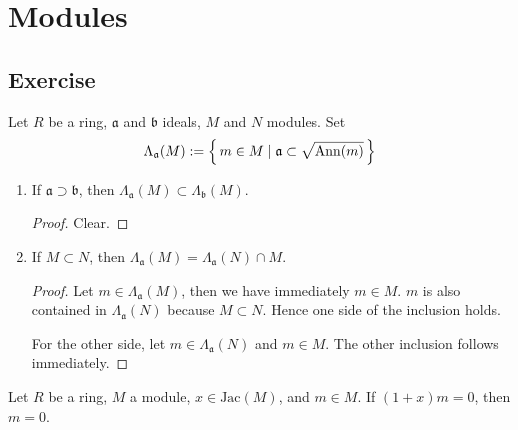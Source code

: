 \chapter{Modules}

\section{Exercise}

\begin{exr}
    Let \(R\) be a ring, \(\mathfrak{a}\) and \(\mathfrak{b}\) ideals, \(M\) and \(N\) modules. Set
    \begin{equation}
        \Lambda_{\mathfrak{a}}(M) := \left\{\, m \in M \mathrel{\mid} \mathfrak{a} \subset \sqrt{\mathrm{Ann}(m)} \,\right\}
    \end{equation}
    \begin{enumerate}
        \item If \(\mathfrak{a} \supset \mathfrak{b}\), then \(\Lambda_\mathfrak{a}(M) \subset \Lambda_\mathfrak{b}(M)\).
        \begin{proof}
            Clear.
        \end{proof}
        \item If \(M \subset N\), then \(\Lambda_\mathfrak{a}(M) =  \Lambda_\mathfrak{a}(N) \cap M\).
        \begin{proof}
            Let \(m \in \Lambda_\mathfrak{a}(M)\), then we have immediately \(m \in M\). \(m\) is also contained in \(\Lambda_\mathfrak{a}(N)\) because \(M \subset N\). Hence one side of the inclusion holds.

            For the other side, let \(m \in \Lambda_\mathfrak{a}(N)\) and \(m \in M\). The other inclusion follows immediately.
        \end{proof}
    \end{enumerate}
\end{exr}

\begin{exr}
    Let \(R\) be a ring, \(M\) a module, \(x \in \mathrm{Jac}(M)\), and \(m \in M\). If \((1 + x)m = 0\), then \(m = 0\).
\end{exr}